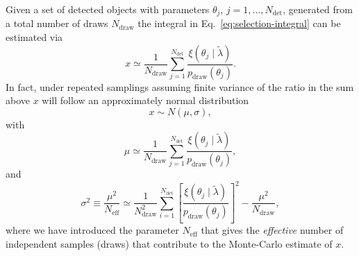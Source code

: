 \documentclass[modern]{aastex62}
\newcommand{\Ndraw}{N_\mathrm{draw}}
\newcommand{\Ndet}{N_\mathrm{det}}
\newcommand{\Neff}{N_\mathrm{eff}}
\newcommand{\pdraw}{p_\mathrm{draw}}
\begin{document}
Given a set of detected objects with parameters $\theta_j$, $j = 1, \ldots,
\Ndet$, generated from a total number of draws $\Ndraw$ the integral in Eq.\
\eqref{eq:selection-integral} can be estimated via
%
\begin{equation}
  \label{eq:simple-monte-carlo-estimate}
  x \simeq \frac{1}{\Ndraw} \sum_{j=1}^{\Ndet} \frac{\xi\left( \theta_j \mid \tilde{\lambda} \right)}{\pdraw\left( \theta_j \right)}.
\end{equation}
%
In fact, under repeated samplings assuming finite variance of the ratio in the
sum above $x$ will follow an approximately normal distribution
%
\begin{equation}
    x \sim N\left( \mu, \sigma \right),
\end{equation}
%
with
%
\begin{equation}
  \mu \simeq \frac{1}{\Ndraw} \sum_{j=1}^{\Ndet} \frac{\xi\left( \theta_j \mid \tilde{\lambda} \right)}{\pdraw\left( \theta_j \right)} ,
\end{equation}
%
and
%
\begin{equation}
    \sigma^2 \equiv \frac{\mu^2}{\Neff} \simeq \frac{1}{\Ndraw^2} \sum_{i=1}^{\Ndet} \left[ \frac{\xi\left( \theta_j \mid \tilde{\lambda} \right)}{\pdraw\left( \theta_j \right)} \right]^2 - \frac{\mu^2}{\Ndraw},
\end{equation}
%
where we have introduced the parameter $\Neff$ that gives the \emph{effective}
number of independent samples (draws) that contribute to the Monte-Carlo
estimate of $x$.
\end{document}
